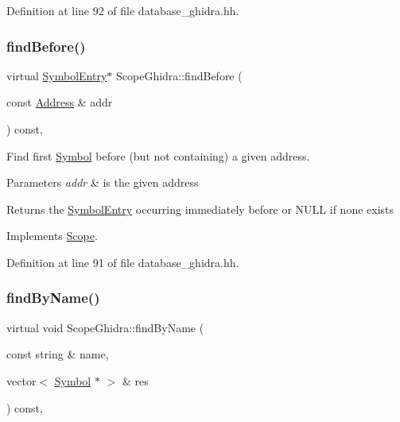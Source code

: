 Definition at line 92 of file database\+\_\+ghidra.\+hh.

\mbox{\label{class_scope_ghidra_a2a7be1b0ee6c1c51d04bb5ae0ea0b721}} 
\subsubsection{\texorpdfstring{findBefore()}{findBefore()}}
{\footnotesize\ttfamily virtual \mbox{\hyperlink{class_symbol_entry}{Symbol\+Entry}}$\ast$ Scope\+Ghidra\+::find\+Before (\begin{DoxyParamCaption}\item[{const \mbox{\hyperlink{class_address}{Address}} \&}]{addr }\end{DoxyParamCaption}) const\hspace{0.3cm}{\ttfamily [inline]}, {\ttfamily [virtual]}}



Find first \mbox{\hyperlink{class_symbol}{Symbol}} before (but not containing) a given address. 


\begin{DoxyParams}{Parameters}
{\em addr} & is the given address \\
\hline
\end{DoxyParams}
\begin{DoxyReturn}{Returns}
the \mbox{\hyperlink{class_symbol_entry}{Symbol\+Entry}} occurring immediately before or N\+U\+LL if none exists 
\end{DoxyReturn}


Implements \mbox{\hyperlink{class_scope_a1c2e83ba66c61b449d85b492b1539625}{Scope}}.



Definition at line 91 of file database\+\_\+ghidra.\+hh.

\mbox{\label{class_scope_ghidra_a26072ceb4215a022050d12b9487e3e87}} 
\subsubsection{\texorpdfstring{findByName()}{findByName()}}
{\footnotesize\ttfamily virtual void Scope\+Ghidra\+::find\+By\+Name (\begin{DoxyParamCaption}\item[{const string \&}]{name,  }\item[{vector$<$ \mbox{\hyperlink{class_symbol}{Symbol}} $\ast$ $>$ \&}]{res }\end{DoxyParamCaption}) const\hspace{0.3cm}{\ttfamily [inline]}, {\ttfamily [virtual]}}



